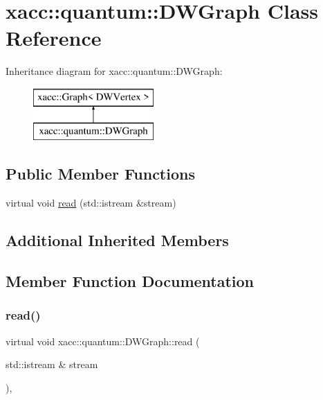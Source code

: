 \hypertarget{a00975}{}\section{xacc\+:\+:quantum\+:\+:D\+W\+Graph Class Reference}
\label{a00975}
Inheritance diagram for xacc\+:\+:quantum\+:\+:D\+W\+Graph\+:\begin{figure}[H]
\begin{center}
\leavevmode
\includegraphics[height=2.000000cm]{a00975}
\end{center}
\end{figure}
\subsection*{Public Member Functions}
\begin{DoxyCompactItemize}
\item 
virtual void \hyperlink{a00975_a008ef5c6434494fddb4ec8f0f4895c75}{read} (std\+::istream \&stream)
\end{DoxyCompactItemize}
\subsection*{Additional Inherited Members}


\subsection{Member Function Documentation}
\mbox{\label{a00975_a008ef5c6434494fddb4ec8f0f4895c75}} 
\subsubsection{\texorpdfstring{read()}{read()}}
{\footnotesize\ttfamily virtual void xacc\+::quantum\+::\+D\+W\+Graph\+::read (\begin{DoxyParamCaption}\item[{std\+::istream \&}]{stream }\end{DoxyParamCaption})\hspace{0.3cm}{\ttfamily [inline]}, {\ttfamily [virtual]}}

